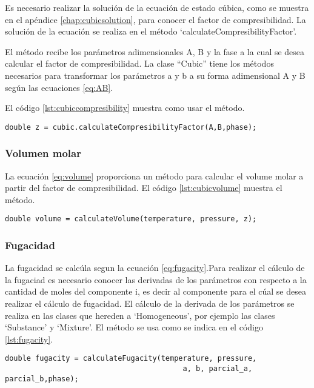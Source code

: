 	Es necesario realizar la solución de la ecuación de estado cúbica, como se muestra en el apéndice \ref{chap:cubicsolution}, para conocer el factor de compresibilidad. La solución de la ecuación se realiza en el método `calculateCompresibilityFactor'.

	El método recibe los parámetros adimensionales A, B y la fase a la cual se desea calcular el factor de compresibilidad. La clase ``Cubic'' tiene los métodos necesarios para transformar los parámetros a y b a su forma adimensional A y B según las ecuaciones \ref{eq:AB}.

	El código \ref{lst:cubiccompresibility} muestra como usar el método.
\begin{lstlisting}[label={lst:cubiccompresibility},caption={Cálculo del factor de compresibilidad con una ecuación de estado cúbica, proporcionando como argumento los parámetros adimensionales $A$,$B$, y la fase a la cual se desea calcular el factor}]
	double z = cubic.calculateCompresibilityFactor(A,B,phase);
\end{lstlisting}
	\subsubsection{Volumen molar}

	La ecuación \ref{eq:volume} proporciona un método para calcular el volume molar a partir del factor de compresibilidad. El código \ref{lst:cubicvolume} muestra el método.
\begin{lstlisting}[label={lst:cubicvolume},caption={Cálculo del volumen molar usando una ecuación de estado cúbica, el método recibe los parámetros de temperatura, presión y factor acéntrico}]
	double volume = calculateVolume(temperature, pressure, z);
\end{lstlisting}	
	\subsubsection{Fugacidad}
	La fugacidad se calcúla segun la ecuación \ref{eq:fugacity}.Para realizar el cálculo de la fugaciad es necesario conocer las derivadas de los parámetros con respecto a la cantidad de moles del componente i, es decir al componente para el cúal se desea realizar el cálculo de fugacidad. El cálculo de la derivada de los parámetros se realiza en las clases que hereden a `Homogeneous', por ejemplo las clases `Substance' y `Mixture'.
	El método se usa como se indica en el código \ref{lst:fugacity}.
\begin{lstlisting}[label={lst:fugacity},caption={Cálculo de fugacidad usando una ecuación de estad cúbica, el método recibe los parámetros de temperatura, presión ,los parámetros de la ecuación cúbica $a$ y $b$, las derivadas con respecto a la cantidad de moles $partial_a$, $partial_b$ y finalmente la fase a la que se desea el cálculo de la fugacidad.}]
	double fugacity = calculateFugacity(temperature, pressure,
										 a, b, parcial_a, parcial_b,phase);
\end{lstlisting}


